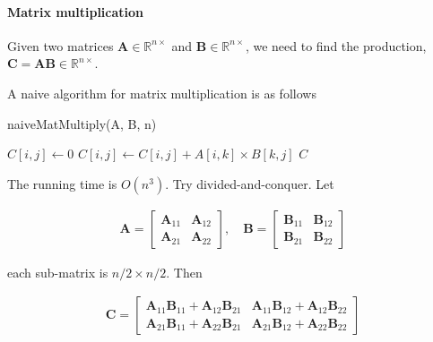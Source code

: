             \paragraph{Matrix multiplication}
                Given two matrices $\mathbf{A} \in \mathbb{R}^{n\times}$ and $\mathbf{B} \in \mathbb{R}^{n\times}$, we need to find the production, $\mathbf{C} = \mathbf{AB} \in \mathbb{R}^{n\times}$.

                A naive algorithm for matrix multiplication is as follows

                \begin{algorithm}[H]
                    \caption{naiveMatMultiply(A, B, n)}
                    \begin{algorithmic}[1]
                                \State $C[i, j] \gets 0$
                                    \State $C[i, j] \gets C[i, j] + A[i, k] \times B[k, j]$
                                \EndFor
                            \EndFor
                        \EndFor
                        \State \Return $C$
                    \end{algorithmic}
                \end{algorithm}

                The running time is $O(n^3)$. Try divided-and-conquer. Let

                \begin{align*}
                    \mathbf{A} = \begin{bmatrix}
                        \mathbf{A}_{11} & \mathbf{A}_{12}\\
                        \mathbf{A}_{21} & \mathbf{A}_{22}
                    \end{bmatrix}, \quad
                    \mathbf{B} = \begin{bmatrix}
                        \mathbf{B}_{11} & \mathbf{B}_{12}\\
                        \mathbf{B}_{21} & \mathbf{B}_{22}
                    \end{bmatrix}
                \end{align*}

                each sub-matrix is $n/2 \times n/2$. Then

                \begin{align*}
                    \mathbf{C} = \begin{bmatrix}
                        \mathbf{A}_{11}\mathbf{B}_{11} + \mathbf{A}_{12}\mathbf{B}_{21} &
                        \mathbf{A}_{11}\mathbf{B}_{12} + \mathbf{A}_{12}\mathbf{B}_{22} \\
                        \mathbf{A}_{21}\mathbf{B}_{11} + \mathbf{A}_{22}\mathbf{B}_{21} & 
                        \mathbf{A}_{21}\mathbf{B}_{12} + \mathbf{A}_{22}\mathbf{B}_{22}
                    \end{bmatrix}
                \end{align*}

